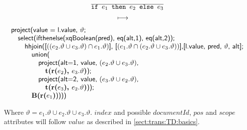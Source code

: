 \begin{equation}
\begin{array}{c}
\frac{}{\displaystyle \mbox{\texttt{if }}e_1\mbox{\texttt{ then }}e_2\mbox{\texttt{ else }}e_3} \\
\longmapsto \begin{array}{c}\mbox{\tiny } \\ \mbox{\tiny } \end{array} \\
\begin{array}{l}
\mbox{\textsf{project(value = l.value, }}\vartheta\mbox{\textsf{;}} \\ \quad
\mbox{\textsf{select(ifthenelse(xqBoolean(pred), eq(alt,1), eq(alt,2));}} \\ \quad \quad
\mbox{\textsf{hhjoin([}}((e_2.\vartheta \cup e_3.\vartheta)\cap e_1.\vartheta)\mbox{\textsf{],
[}}(e_1.\vartheta\cap (e_2.\vartheta\cup e_3.\vartheta))
\mbox{\textsf{],}} 
\mbox{\textsf{[l.value, pred, }}\vartheta\mbox{\textsf{,
alt];}}\\\quad\quad\quad \mbox{\textsf{union(}} \\ \quad\quad\quad\quad \mbox{\textsf{project(alt=1, value, }}(e_2.\vartheta \cup e_3.\vartheta)\mbox{\textsf{,}}\\\quad\quad\quad\quad\quad
\mbox{\textbf{t(r(}}e_2\mbox{\textbf{), }}e_3.\vartheta\mbox{\textbf{)}\textsf{);}} \\ \quad\quad\quad\quad
\mbox{\textsf{project(alt=2, value, }}(e_3.\vartheta\cup e_2.\vartheta)\mbox{\textsf{,}}\\\quad\quad\quad\quad\quad
\mbox{\textbf{t(r(}}e_3\mbox{\textbf{), }}e_2.\vartheta\mbox{\textbf{)}\textsf{));}}\\\quad\quad\quad
\mbox{\textbf{B(r(}}e_1\mbox{\textbf{)}\textsf{))))}}
\end{array}
\end{array}
\label{rule:trans:TD:conditional}
\end{equation}

Where $\vartheta = e_1.\vartheta \cup e_2.\vartheta \cup e_3.\vartheta$. $index$ and possible $documentId$, $pos$
and $scope$ attributes will follow $value$ as described in \ref{sect:trans:TD:basics}.

